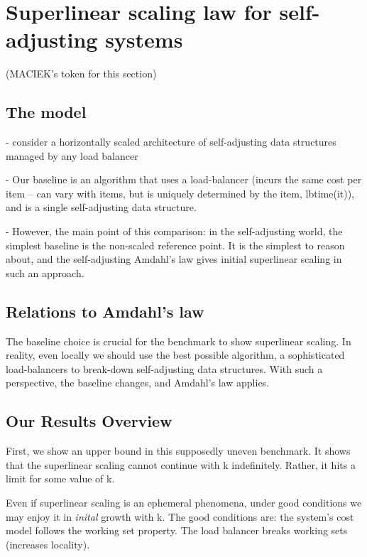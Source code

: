 

\section{Superlinear scaling law for self-adjusting systems}

(MACIEK's token for this section)


\subsection{The model}

- consider a horizontally scaled architecture of self-adjusting data structures managed by any load balancer

- Our baseline is an algorithm that uses a load-balancer (incurs the same cost per item -- can vary with items, but is uniquely determined by the item, lbtime(it)), and is a single self-adjusting data structure.

- However, the main point of this comparison: in the self-adjusting world, the simplest baseline is the non-scaled reference point. It is the simplest to reason about, and the self-adjusting Amdahl's law gives initial superlinear scaling in such an approach.


\subsection{Relations to Amdahl's law}

The baseline choice is crucial for the benchmark to show superlinear scaling.
In reality, even locally we should use the best possible algorithm, a sophisticated load-balancers to break-down self-adjusting data structures.
With such a perspective, the baseline changes, and Amdahl's law applies.

\subsection{Our Results Overview}

First, we show an upper bound in this supposedly uneven benchmark.
It shows that the superlinear scaling cannot continue with k indefinitely. Rather, it hits a limit for some value of k.

Even if superlinear scaling is an ephemeral phenomena, under good conditions we may enjoy it in \emph{inital} growth with k.
The good conditions are: the system's cost model follows the working set property. The load balancer breaks working sets (increases locality).


